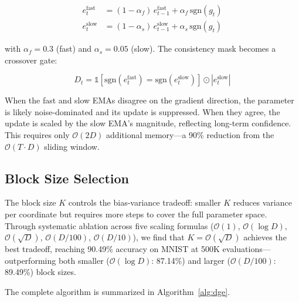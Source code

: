 \documentclass[10pt]{article}
\begin{document}
\begin{align}
    e_t^{\text{fast}} &= (1 - \alpha_f) \, e_{t-1}^{\text{fast}} + \alpha_f \, \text{sgn}(g_t) \label{eq:ema_fast} \\
    e_t^{\text{slow}} &= (1 - \alpha_s) \, e_{t-1}^{\text{slow}} + \alpha_s \, \text{sgn}(g_t) \label{eq:ema_slow}
\end{align}

\noindent with $\alpha_f = 0.3$ (fast) and $\alpha_s = 0.05$ (slow). The consistency mask becomes a crossover gate:

\begin{equation}
    D_t = \mathbb{1}[\text{sgn}(e_t^{\text{fast}}) = \text{sgn}(e_t^{\text{slow}})] \odot |e_t^{\text{slow}}|
    \label{eq:ds_ema}
\end{equation}

When the fast and slow EMAs disagree on the gradient direction, the parameter is likely noise-dominated and its update is suppressed. When they agree, the update is scaled by the slow EMA's magnitude, reflecting long-term confidence. This requires only $\mathcal{O}(2D)$ additional memory---a 90\% reduction from the $\mathcal{O}(T \cdot D)$ sliding window.

\subsection{Block Size Selection}
\label{sec:k_scaling}

The block size $K$ controls the bias-variance tradeoff: smaller $K$ reduces variance per coordinate but requires more steps to cover the full parameter space. Through systematic ablation across five scaling formulas ($\mathcal{O}(1)$, $\mathcal{O}(\log D)$, $\mathcal{O}(\sqrt{D})$, $\mathcal{O}(D/100)$, $\mathcal{O}(D/10)$), we find that $K = \mathcal{O}(\sqrt{D})$ achieves the best tradeoff, reaching 90.49\% accuracy on MNIST at 500K evaluations---outperforming both smaller ($\mathcal{O}(\log D)$: 87.14\%) and larger ($\mathcal{O}(D/100)$: 89.49\%) block sizes.

The complete algorithm is summarized in Algorithm~\ref{alg:dge}.
\end{document}
